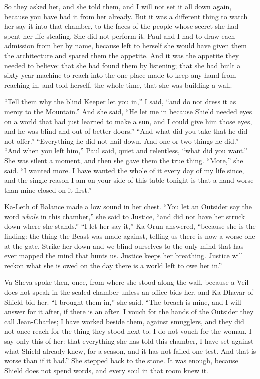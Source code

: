So they asked her, and she told them, and I will not set it all down again, because you have had it from her already. But it was a different thing to watch her say it into that chamber, to the faces of the people whose secret she had spent her life stealing. She did not perform it. Paul and I had to draw each admission from her by name, because left to herself she would have given them the architecture and spared them the appetite. And it was the appetite they needed to believe: that she had found them by listening; that she had built a sixty-year machine to reach into the one place made to keep any hand from reaching in, and told herself, the whole time, that she was building a wall.\par

``Tell them why the blind Keeper let you in,'' I said, ``and do not dress it as mercy to the Mountain.'' And she said, ``He let me in because Shield needed eyes on a world that had just learned to make a sun, and I could give him those eyes, and he was blind and out of better doors.'' ``And what did you take that he did not offer.'' ``Everything he did not nail down. And one or two things he did.'' ``And when you left him,'' Paul said, quiet and relentless, ``what did you want.'' She was silent a moment, and then she gave them the true thing. ``More,'' she said. ``I wanted more. I have wanted the whole of it every day of my life since, and the single reason I am on your side of this table tonight is that a hand worse than mine closed on it first.''\par

Ka-Leth of Balance made a low sound in her chest. ``You let an Outsider say the word \emph{whole} in this chamber,'' she said to Justice, ``and did not have her struck down where she stands.'' ``I let her say it,'' Ka-Orun answered, ``because she is the finding: the thing the Beast was made against, telling us there is now a worse one at the gate. Strike her down and we blind ourselves to the only mind that has ever mapped the mind that hunts us. Justice keeps her breathing. Justice will reckon what she is owed on the day there is a world left to owe her in.''\par

Va-Sheva spoke then, once, from where she stood along the wall, because a Veil does not speak in the sealed chamber unless an office bids her, and Ka-Dhavar of Shield bid her. ``I brought them in,'' she said. ``The breach is mine, and I will answer for it after, if there is an after. I vouch for the hands of the Outsider they call Jean-Charles; I have worked beside them, against smugglers, and they did not once reach for the thing they stood next to. I do not vouch for the woman. I say only this of her: that everything she has told this chamber, I have set against what Shield already knew, for a season, and it has not failed one test. And that is worse than if it had.'' She stepped back to the stone. It was enough, because Shield does not spend words, and every soul in that room knew it.\par

